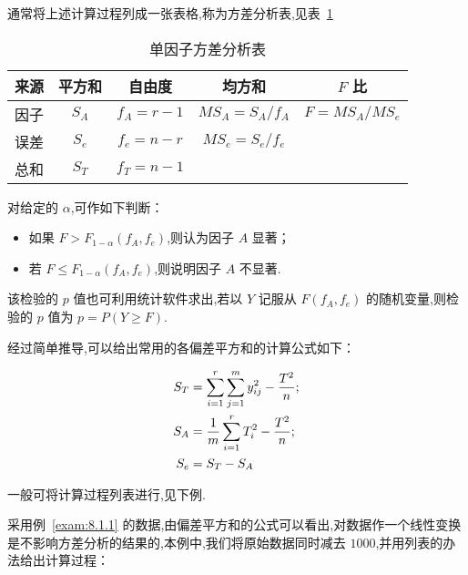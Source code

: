 通常将上述计算过程列成一张表格,称为方差分析表,见表~\ref{tab:8.1.3}

\begin{table}[htbp]
\centering
\caption{单因子方差分析表\label{tab:8.1.3}}
\begin{tabular}{ccccc}
\toprule
来源 & 平方和 & 自由度 & 均方和 & $F$ 比\\
\midrule
因子 & $S_A$ & $f_{A} = r-1$ & $MS_{A} = S_{A}/f_A$ & $F = MS_{A}/MS_{e}$ \\
误差 & $S_{e}$ & $f_{e} = n - r$ & $MS_{e} = S_e/f_e$ & \\
\midrule
总和 & $S_{T}$ & $f_{T} = n - 1$ & & \\
\bottomrule
\end{tabular}
\end{table}

对给定的 $\alpha$,可作如下判断：
\begin{itemize}
\item 如果 $F > F_{1-\alpha}(f_A,f_e)$,则认为因子 $A$ 显著；
\item 若 $F \leq F_{1-\alpha}(f_A, f_e)$,则说明因子 $A$ 不显著.
\end{itemize}
该检验的 $p$ 值也可利用统计软件求出,若以 $Y$ 记服从 $F(f_A,f_e)$ 的随机变量,则检验的 $p$ 值为 $p = P(Y \geq F)$.

经过简单推导,可以给出常用的各偏差平方和的计算公式如下：

\begin{align}
S_T &= \sum_{i=1}^{r}\sum_{j=1}^{m} y_{ij}^2 - \frac{T^2}{n}; \notag\\
S_A &= \frac{1}{m} \sum_{i=1}^{r} T_{i}^2 - \frac{T^2}{n}; \label{eq:8.1.19}\\
S_e &= S_T - S_A \notag
\end{align}

一般可将计算过程列表进行,见下例.

\begin{example}\label{exam:8.1.2}
采用例~\ref{exam:8.1.1} 的数据,由偏差平方和的公式可以看出,对数据作一个线性变换是不影响方差分析的结果的,本例中,我们将原始数据同时减去 $1000$,并用列表的办法给出计算过程：
\end{example}

